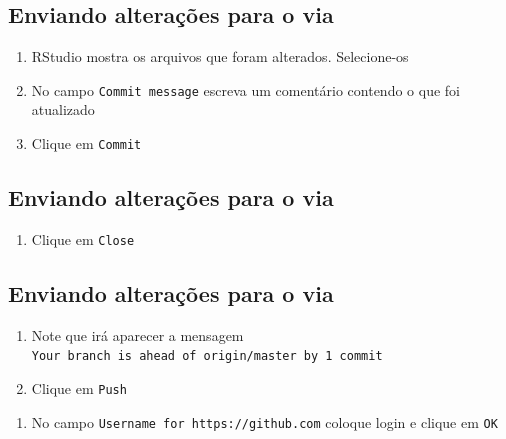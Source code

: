 \documentclass[
  letterpaper,
  DIV=11,
  numbers=noendperiod]{scrartcl}
\providecommand{\tightlist}{%
  \setlength{\itemsep}{0pt}\setlength{\parskip}{0pt}}
\begin{document}
\subsection{\texorpdfstring{Enviando alterações para o via
}{Enviando alterações para o  via }}\label{enviando-alterauxe7uxf5es-para-o-via-1}

\begin{enumerate}
\def\labelenumi{\arabic{enumi}.}
\setcounter{enumi}{1}
\item
  RStudio mostra os arquivos que foram alterados. Selecione-os
\item
  No campo \texttt{Commit\ message} escreva um comentário contendo o que
  foi atualizado
\item
  Clique em \texttt{Commit}
\end{enumerate}

\subsection{\texorpdfstring{Enviando alterações para o via
}{Enviando alterações para o  via }}\label{enviando-alterauxe7uxf5es-para-o-via-2}

\begin{enumerate}
\def\labelenumi{\arabic{enumi}.}
\setcounter{enumi}{4}
\tightlist
\item
  Clique em \texttt{Close}
\end{enumerate}

\subsection{\texorpdfstring{Enviando alterações para o via
}{Enviando alterações para o  via }}\label{enviando-alterauxe7uxf5es-para-o-via-3}

\begin{enumerate}
\def\labelenumi{\arabic{enumi}.}
\setcounter{enumi}{5}
\item
  Note que irá aparecer a mensagem
  \texttt{Your\ branch\ is\ ahead\ of\ \textquotesingle{}origin/master\textquotesingle{}\ by\ 1\ commit}
\item
  Clique em \texttt{Push}
\end{enumerate}

\begin{enumerate}
\def\labelenumi{\arabic{enumi}.}
\setcounter{enumi}{7}
\tightlist
\item
  No campo
  \texttt{Username\ for\ \textquotesingle{}https://github.com\textquotesingle{}}
  coloque login e clique em \texttt{OK}
\end{enumerate}
\end{document}
